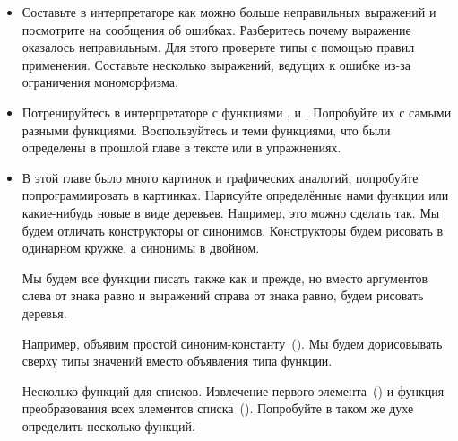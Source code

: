 \begin{itemize}
\item
  Составьте в интерпретаторе как можно больше неправильных выражений и
  посмотрите на сообщения об ошибках. Разберитесь почему выражение
  оказалось неправильным. Для этого проверьте типы с помощью правил
  применения. Составьте несколько выражений, ведущих к ошибке из-за
  ограничения мономорфизма.
\item
  Потренируйтесь в интерпретаторе с функциями ,  и
  . Попробуйте их с самыми разными функциями. Воспользуйтесь и
  теми функциями, что были определены в прошлой главе в тексте или в
  упражнениях.
\item
  В этой главе было много картинок и графических аналогий, попробуйте
  попрограммировать в картинках. Нарисуйте определённые нами функции или
  какие-нибудь новые в виде деревьев. Например, это можно сделать так.
  Мы будем отличать конструкторы от синонимов. Конструкторы будем
  рисовать в одинарном кружке, а синонимы в двойном.


  Мы будем все функции писать также как и прежде, но вместо аргументов
  слева от знака равно и выражений справа от знака равно, будем рисовать
  деревья.

  Например, объявим простой синоним-константу~(). Мы будем
  дорисовывать сверху типы значений вместо объявления типа функции.

  Несколько функций для списков. Извлечение первого
  элемента~() и функция преобразования всех элементов
  списка~(). Попробуйте в таком же духе определить
  несколько функций.
\end{itemize}


